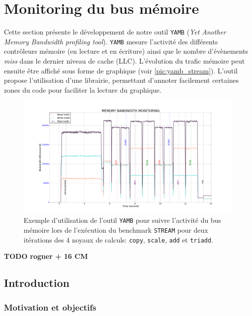 \section{Monitoring du bus mémoire}\label{sec:yamb}


Cette section présente le développement de notre outil \verb=YAMB= (\textit{Yet Another Memory Bandwidth profiling tool}). \verb=YAMB= mesure l'activité des différents contrôleurs mémoire (en lecture et en écriture) ainsi que le nombre d'évènements \textit{\gls{miss}} dans le dernier niveau de cache (LLC). L'évolution du trafic mémoire peut ensuite être affiché sous forme de graphique (voir \autoref{pic:yamb_stream}). L'outil propose l'utilisation d'une librairie, permettant d'annoter facilement certaines zones du code pour faciliter la lecture du graphique.

\begin{figure}[h!]
\center
\includegraphics[width=16cm]{images/yamb_stream.png}
\caption{\label{pic:yamb_stream} Exemple d'utilisation de l'outil \texttt{YAMB} pour suivre l'activité du bus mémoire lors de l'exécution du benchmark \texttt{STREAM} \cite{McCalpin1995} pour deux itérations des 4 noyaux de calculs: \texttt{copy}, \texttt{scale}, \texttt{add} et \texttt{triadd}.}
\end{figure}
\textbf{TODO rogner + 16 CM}




\subsection{Introduction}

    \subsubsection{Motivation et objectifs}
     
